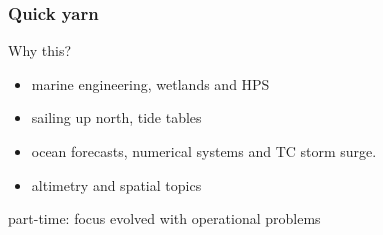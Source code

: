 \begin{frame}
\frametitle{Quick yarn}
Why this?
\begin{itemize}
    \item marine engineering, wetlands and HPS
    \item sailing up north, tide tables
    \item ocean forecasts, numerical systems and TC storm surge.
    \item altimetry and spatial topics
\end{itemize} 
\vspace{1cm}
part-time: focus evolved with operational problems

\end{frame}